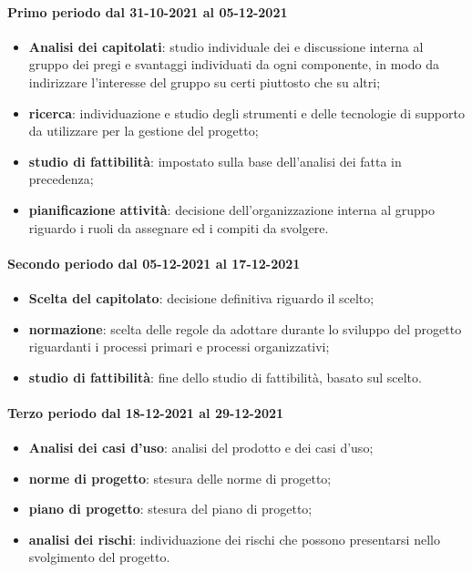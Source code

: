 \paragraph{Primo periodo dal 31-10-2021 al 05-12-2021} 
\begin{itemize} 
	\item \textbf{Analisi dei capitolati}: studio individuale dei  e discussione interna al gruppo dei pregi e svantaggi individuati da ogni componente, in modo da indirizzare l’interesse del gruppo su certi  piuttosto che su altri; 
	\item \textbf{ricerca}: individuazione e studio degli strumenti e delle tecnologie di supporto da utilizzare per la gestione del progetto; 
	\item \textbf{studio di fattibilità}: impostato sulla base dell'analisi dei  fatta in precedenza; 
	\item \textbf{pianificazione attività}: decisione dell'organizzazione interna al gruppo riguardo i ruoli da assegnare ed i compiti da svolgere. 
\end{itemize} 

\paragraph{Secondo periodo dal 05-12-2021 al 17-12-2021} 
\begin{itemize} 
	\item \textbf{Scelta del capitolato}: decisione definitiva riguardo il  scelto; 
	\item \textbf{normazione}: scelta delle regole da adottare durante lo sviluppo del progetto riguardanti i 
	processi primari e processi organizzativi; 
	\item \textbf{studio di fattibilità}: fine dello studio di fattibilità, basato sul  scelto. 
\end{itemize} 

\paragraph{Terzo periodo dal 18-12-2021 al 29-12-2021} 
\begin{itemize} 
	\item \textbf{Analisi dei casi d'uso}: analisi del prodotto e dei casi d’uso; 
	\item \textbf{norme di progetto}: stesura delle norme di progetto; 
	\item \textbf{piano di progetto}: stesura del piano di progetto; 
	\item \textbf{analisi dei rischi}: individuazione dei rischi che possono presentarsi nello svolgimento del progetto. 
\end{itemize} 


